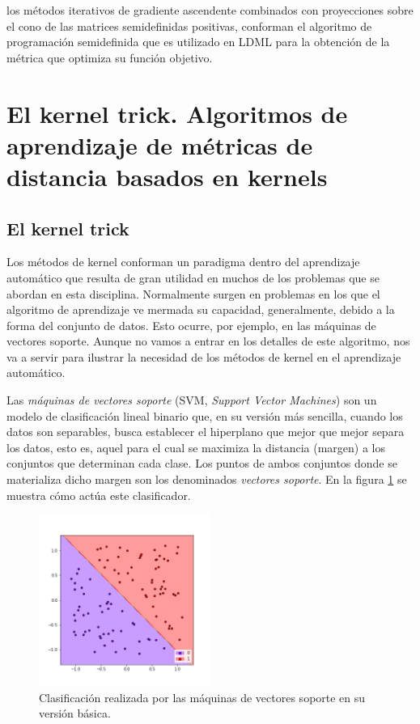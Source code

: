 \documentclass{book}
\begin{document}
los métodos iterativos de gradiente ascendente combinados con proyecciones sobre el cono de las matrices semidefinidas positivas, conforman el algoritmo de programación semidefinida que es utilizado en LDML para la obtención de la métrica que optimiza su función objetivo.




\section{El kernel trick. Algoritmos de aprendizaje de métricas de distancia basados en kernels}

\subsection{El kernel trick}

Los métodos de kernel conforman un paradigma dentro del aprendizaje automático que resulta de gran utilidad en muchos de los problemas que se abordan en esta disciplina. Normalmente surgen en problemas en los que el algoritmo de aprendizaje ve mermada su capacidad, generalmente, debido a la forma del conjunto de datos. Esto ocurre, por ejemplo, en las máquinas de vectores soporte. Aunque no vamos a entrar en los detalles de este algoritmo, nos va a servir para ilustrar la necesidad de los métodos de kernel en el aprendizaje automático.

Las \emph{máquinas de vectores soporte} (SVM, \emph{Support Vector Machines}) son un modelo de clasificación lineal binario que, en su versión más sencilla, cuando los datos son separables, busca establecer el hiperplano que mejor que mejor separa los datos, esto es, aquel para el cual se maximiza la distancia (margen) a los conjuntos que determinan cada clase. Los puntos de ambos conjuntos donde se materializa dicho margen son los denominados \emph{vectores soporte}. En la figura \ref{fig:svm_ejemplo} se muestra cómo actúa este clasificador.

\begin{figure}[h]
	\centering
	\includegraphics[width=0.5\textwidth]{images/svm_example.png}
	\caption{Clasificación realizada por las máquinas de vectores soporte en su versión básica.} \label{fig:svm_ejemplo}
\end{figure} 
\end{document}
